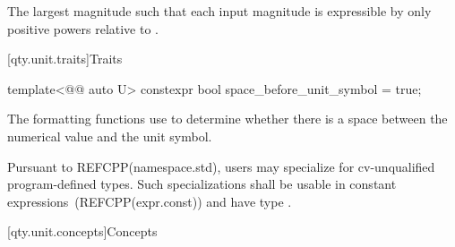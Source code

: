 \begin{itemdescr}
\pnum
\returns
The largest magnitude 
such that each input magnitude is expressible
by only positive powers relative to .
\end{itemdescr}

[qty.unit.traits]{Traits}

\begin{itemdecl}
template<@@ auto U>
constexpr bool space_before_unit_symbol = true;
\end{itemdecl}

\begin{itemdescr}
\pnum
The formatting functions use 
to determine whether there is a space
between the numerical value and the unit symbol.

\pnum
\remarks
Pursuant to REFCPP(namespace.std),
users may specialize 
for cv-unqualified program-defined types.
Such specializations shall be usable in constant expressions~(REFCPP(expr.const))
and have type .
\end{itemdescr}

[qty.unit.concepts]{Concepts}

